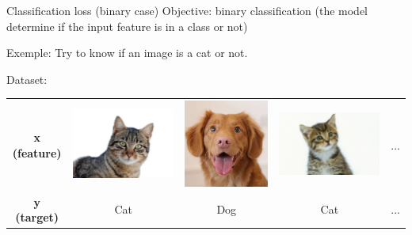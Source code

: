 \documentclass[handout]{beamer}
\begin{document}
\begin{frame}{Classification loss (binary case)}
Objective: binary classification (the model determine if the input feature is in a class or not)\\
\vspace{1em}

Exemple: Try to know if an image is a cat or not.\\
\vspace{1em}

Dataset:

\begin{table}[]
    \centering
    \begin{tabular}{ccccc}
        {\bf x (feature)} &
         \includegraphics[width=.2\textwidth]{fig/L2/cat1.jpg}& 
         \includegraphics[width=.2\textwidth]{fig/L2/dog1.jpg}&
         \includegraphics[width=.2\textwidth]{fig/L2/cat2.jpg}&
         ...
         \\
        {\bf y (target)} & Cat & Dog & Cat & ...\\
    \end{tabular}
\end{table}

\end{frame}
\end{document}
